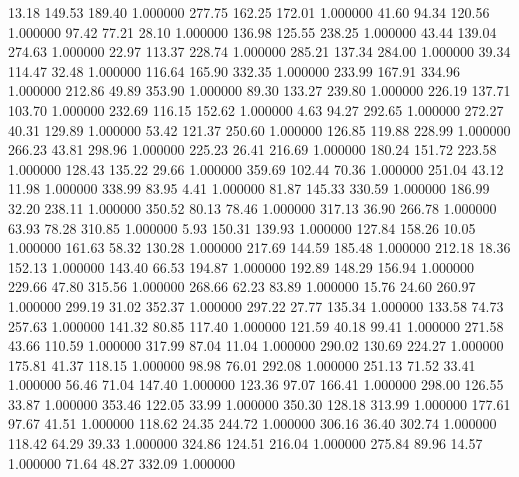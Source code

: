      13.18    149.53    189.40  1.000000
    277.75    162.25    172.01  1.000000
     41.60     94.34    120.56  1.000000
     97.42     77.21     28.10  1.000000
    136.98    125.55    238.25  1.000000
     43.44    139.04    274.63  1.000000
     22.97    113.37    228.74  1.000000
    285.21    137.34    284.00  1.000000
     39.34    114.47     32.48  1.000000
    116.64    165.90    332.35  1.000000
    233.99    167.91    334.96  1.000000
    212.86     49.89    353.90  1.000000
     89.30    133.27    239.80  1.000000
    226.19    137.71    103.70  1.000000
    232.69    116.15    152.62  1.000000
      4.63     94.27    292.65  1.000000
    272.27     40.31    129.89  1.000000
     53.42    121.37    250.60  1.000000
    126.85    119.88    228.99  1.000000
    266.23     43.81    298.96  1.000000
    225.23     26.41    216.69  1.000000
    180.24    151.72    223.58  1.000000
    128.43    135.22     29.66  1.000000
    359.69    102.44     70.36  1.000000
    251.04     43.12     11.98  1.000000
    338.99     83.95      4.41  1.000000
     81.87    145.33    330.59  1.000000
    186.99     32.20    238.11  1.000000
    350.52     80.13     78.46  1.000000
    317.13     36.90    266.78  1.000000
     63.93     78.28    310.85  1.000000
      5.93    150.31    139.93  1.000000
    127.84    158.26     10.05  1.000000
    161.63     58.32    130.28  1.000000
    217.69    144.59    185.48  1.000000
    212.18     18.36    152.13  1.000000
    143.40     66.53    194.87  1.000000
    192.89    148.29    156.94  1.000000
    229.66     47.80    315.56  1.000000
    268.66     62.23     83.89  1.000000
     15.76     24.60    260.97  1.000000
    299.19     31.02    352.37  1.000000
    297.22     27.77    135.34  1.000000
    133.58     74.73    257.63  1.000000
    141.32     80.85    117.40  1.000000
    121.59     40.18     99.41  1.000000
    271.58     43.66    110.59  1.000000
    317.99     87.04     11.04  1.000000
    290.02    130.69    224.27  1.000000
    175.81     41.37    118.15  1.000000
     98.98     76.01    292.08  1.000000
    251.13     71.52     33.41  1.000000
     56.46     71.04    147.40  1.000000
    123.36     97.07    166.41  1.000000
    298.00    126.55     33.87  1.000000
    353.46    122.05     33.99  1.000000
    350.30    128.18    313.99  1.000000
    177.61     97.67     41.51  1.000000
    118.62     24.35    244.72  1.000000
    306.16     36.40    302.74  1.000000
    118.42     64.29     39.33  1.000000
    324.86    124.51    216.04  1.000000
    275.84     89.96     14.57  1.000000
     71.64     48.27    332.09  1.000000
